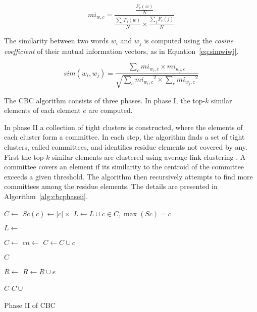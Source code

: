 \begin{equation}
 mi_{w,c} = \frac{\frac{F_c(w)}{N}}
                 {\frac{\sum_iF_i(w)}{N} \times
                  \frac{\sum_jF_c(j)}{N}}
 \label{eq:miwc}
\end{equation}

The similarity between two words $w_i$ and $w_j$ is computed using the
\textit{cosine coefficient} of their mutual information vectors, as in
Equation~\ref{eq:simwiwj}.

\begin{equation}
 sim(w_i,w_j) = \frac{\sum_c mi_{w_i,c} \times mi_{w_j,c}}
                     {\sqrt{\sum_c{mi_{w_i,c}}^2 \times \sum_c{mi_{w_j,c}}^2}}
 \label{eq:simwiwj}
\end{equation}

The \ac{CBC} algorithm consists of three phases. In phase I, the top-$k$
similar elements of each element $e$ are computed.

In phase II a collection of tight clusters is constructed, where the
elements of each cluster form a committee. In each step, the algorithm finds a
set of tight clusters, called committees, and identifies residue elements not
covered by any. First the top-$k$ similar elements are clustered using
average-link clustering \cite{han2000data}. A committee covers an element if
its similarity to the centroid of the committee exceeds a given threshold. The
algorithm then recursively attempts to find more committees among the residue
elements. The details are presented in Algorithm~\ref{alg:cbcphaseii}.

\begin{algorithm}
 \begin{algorithmic}
    \State $C \gets$ 
      \State $Sc(c) \gets |c| \times $ 
    \EndFor
    \State $L \gets L \cup c \in C, \max(Sc) = c$
  \EndFor

  \State $L \gets$ 

  \State $C \gets$ 
    \State $cn \gets$ 
      \State $C \gets C \cup c$
    \EndIf
  \EndFor

    \State \Return $C$
  \EndIf

  \State $R \gets$ 
      \State $R \gets R \cup e$
    \EndIf
  \EndFor

    \State \Return $C$
  \Else
    \State \Return $C \cup$ 
  \EndIf
\EndFunction
 \end{algorithmic}

 \caption{\label{alg:cbcphaseii} Phase II of CBC}
\end{algorithm}


